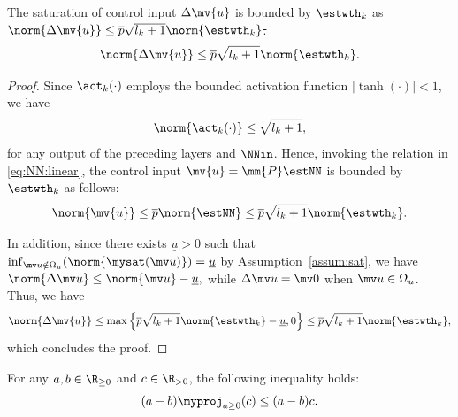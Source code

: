 \documentclass[letterpaper, journal]{IEEEtran}
\providecommand{\DIFdel}[1]{{\protect\color{red}\sout{#1}}} %
\providecommand{\DIFaddbegin}{} %
\providecommand{\DIFaddend}{} %
\providecommand{\DIFdelbegin}{} %
\providecommand{\DIFdelend}{} %
\begin{document}
\begin{lem} \label{lem:delta:u:bound}
  The saturation of control input $\Delta\mv{u}$ is bounded by $\estwth_k$ as 
  \DIFdelbegin \DIFdel{$\norm{\Delta\mv{u}}\le \overline{p}\sqrt{l_k+1}\norm{\estwth_k}$.
}\DIFdelend \DIFaddbegin \begin{equation*}
    \norm{\Delta\mv{u}}
    \le 
    \overline{p}
    \sqrt{l_k+1}
    \norm{\estwth_k}
    .
  \end{equation*}
\DIFaddend \end{lem}

\begin{proof}
  Since $\act_k(\cdot)$ employs the bounded activation function $\vert\tanh(\cdot)\vert < 1$, we have 
  \begin{equation}
    \norm{\act_k(\cdot)} \le \sqrt{l_k+1}
    ,
  \end{equation}
  for any output of the preceding layers and $\NNin$.
  Hence, invoking the relation in \eqref{eq:NN:linear}, the control input $\mv{u}=\mm{P}\estNN$ is bounded by $\estwth_k$ as follows:
  \begin{equation} \label{eq:NN:bound}
    \norm{\mv{u}} 
    \le
    \overline{p}
    \norm{\estNN}
    \le
    \overline{p}
    \sqrt{l_k+1}\norm{\estwth_k}
    .   
  \end{equation}

  In addition, since there exists $\underline{u}>0$ such that $\inf_{\mv u\notin\Omega_u}\allowbreak(\norm{\mysat(\mv u)})=\underline{u}$ by Assumption~\ref{assum:sat}, we have
  $
    \norm{\Delta\mv u}
    \le
    \norm{\mv u}-\underline{u}
    ,
  $ 
  while $\Delta\mv u=\mv 0$ when $\mv u\in\Omega_u$.
  Thus, we have
  \begin{equation}
    \norm{\Delta\mv{u}}
    \le
    \max
    \left\{
      \overline{p}\sqrt{l_k+1}\norm{\estwth_k}
      -
      \underline{u}
      ,
      0
    \right\}
    \le
    \overline{p}\sqrt{l_k+1}\norm{\estwth_k}
    ,  
  \end{equation}
  which concludes the proof.    
\end{proof}

\begin{lem} \label{lem:proj:ineq}
  For any $a,b\in\R_{\ge0}$ and $c\in\R_{>0}$, the following inequality holds:
  \begin{equation}
    (a-b)\myproj_{a\ge0}(c) \le (a-b) c.
  \end{equation}
\end{lem}
\end{document}
